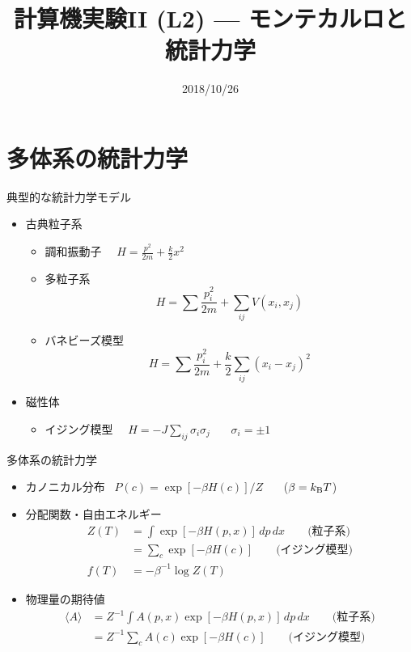 \documentclass[dvipdfmx]{beamer}
\title{計算機実験II (L2) --- モンテカルロと統計力学}
\date{2018/10/26}
\begin{document}
\begin{frame}
  \titlepage
  \tableofcontents
\end{frame}

\section{多体系の統計力学}

\begin{frame}[t,fragile]{典型的な統計力学モデル}
  \begin{itemize}
  \item 古典粒子系
    \begin{itemize}
    \item 調和振動子 \ \ $\displaystyle H = \frac{p^2}{2m} + \frac{k}{2}x^2$
    \item 多粒子系
      \[
      H = \sum \frac{p_i^2}{2m} + \sum_{ij} V(x_i, x_j)
      \]
    \item バネビーズ模型
      \[
      H = \sum \frac{p_i^2}{2m} + \frac{k}{2} \sum_{ij} (x_i-x_j)^2
      \]
  \end{itemize}
  \item 磁性体
    \begin{itemize}
    \item イジング模型 \ \ $\displaystyle H = -J \sum_{ij} \sigma_i \sigma_j$ \ \ \ $\sigma_i = \pm 1$
    \end{itemize}
  \end{itemize}
\end{frame}

\begin{frame}[t,fragile]{多体系の統計力学}
  \begin{itemize}
    \setlength{\itemsep}{1em}
  \item カノニカル分布 \ $P(c) = \exp [- \beta H(c) ] / Z$ \ \ \ ($\beta = k_{\rm B} T$)
  \item 分配関数・自由エネルギー
    \begin{align*}
      Z(T) &= \int \exp [- \beta H(p,x) ] \, dp \, dx \qquad \text{(粒子系)} \\
      &= \sum_c \exp [- \beta H(c) ] \qquad \text{(イジング模型)} \\
      f(T) &= - \beta^{-1} \log Z(T)
    \end{align*}
  \item 物理量の期待値
    \begin{align*}
      \langle A \rangle &= Z^{-1} \int A(p,x) \exp [- \beta H(p,x) ] \, dp \, dx \qquad \text{(粒子系)} \\
      &= Z^{-1} \sum_c A(c) \exp [- \beta H(c) ] \qquad \text{(イジング模型)}
    \end{align*}
  \end{itemize}
\end{frame}
\end{document}
